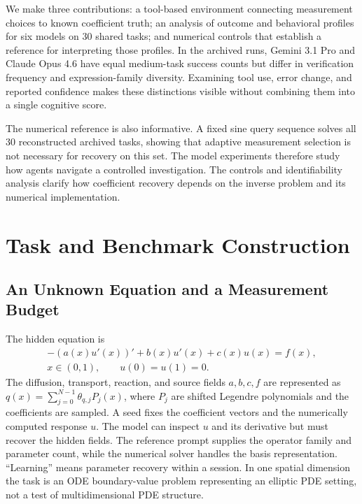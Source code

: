 \documentclass{article}
\begin{document}
We make three contributions: a tool-based environment connecting measurement
choices to known coefficient truth; an analysis of outcome and behavioral
profiles for six models on 30 shared tasks; and numerical controls that establish
a reference for interpreting those profiles. In the archived runs, Gemini 3.1
Pro and Claude Opus 4.6 have equal medium-task success counts but differ in
verification frequency and expression-family diversity. Examining tool use,
error change, and reported confidence makes these distinctions visible without
combining them into a single cognitive score.

The numerical reference is also informative. A fixed sine query sequence solves
all 30 reconstructed archived tasks, showing that adaptive measurement selection
is not necessary for recovery on this set. The model experiments therefore
study how agents navigate a controlled investigation. The controls and
identifiability analysis clarify how coefficient recovery depends on the inverse
problem and its numerical implementation.

\section{Task and Benchmark Construction}
\label{sec:task}

\subsection{An Unknown Equation and a Measurement Budget}

The hidden equation is
\begin{equation}
\begin{gathered}
 -(a(x)u'(x))'+b(x)u'(x)+c(x)u(x)=f(x),\\
 x\in(0,1),\qquad u(0)=u(1)=0.
\end{gathered}
\label{eq:pde}
\end{equation}
The diffusion, transport, reaction, and source fields \(a,b,c,f\) are
represented as \(q(x)=\sum_{j=0}^{N-1}\theta_{q,j}P_j(x)\), where \(P_j\)
are shifted Legendre polynomials and the coefficients are sampled. A seed fixes
the coefficient vectors and the numerically computed response \(u\). The model can inspect \(u\) and its
derivative but must recover the hidden fields. The reference prompt supplies the
operator family and parameter count, while the numerical solver handles the
basis representation. ``Learning'' means parameter recovery within a session. In one spatial
dimension the task is an ODE boundary-value problem representing an elliptic
PDE setting, not a test of multidimensional PDE structure.
\end{document}
